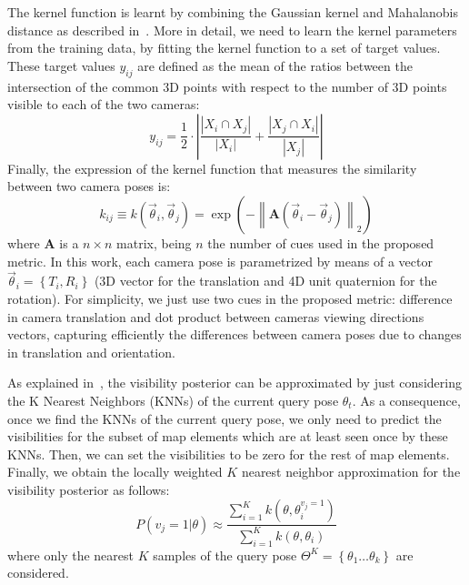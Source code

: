 The kernel function is learnt by combining the Gaussian kernel and
Mahalanobis distance as described in~\cite{Alcantarilla11icra}. More
in detail, we need to learn the kernel parameters from the training
data, by fitting the kernel function to a set of target values. These
target values $y_{ij}$ are defined as the mean of the ratios between
the intersection of the common 3D points with respect to the number of
3D points visible to each of the two cameras:
%
\begin{equation}\label{eq:similarity_weighted}
y_{ij} = \frac{1}{2}\cdot \left| \frac{\left|X_i \cap X_j \right|}{\left|X_i\right|} + \frac{\left|X_j \cap X_i\right|}{\left|X_j\right|} \right|
\end{equation}
%
Finally, the expression of the kernel function that measures the similarity between two camera poses is:
%
\begin{equation}\label{eq:visibility_metric}
 k_{ij} \equiv k(\vec{\theta}_i,\vec{\theta}_j) =\exp\left(-\left\| \mathbf{A}(\vec{\theta}_i-\vec{\theta}_j)\right\|_{2}\right)
\end{equation}
%
where $\mathbf{A}$ is a $n \times n$ matrix, being $n$ the number of
cues used in the proposed metric. In this work, each camera pose is
parametrized by means of a vector $\vec{\theta}_i =
\left\{T_{i},R_{i}\right\}$ (3D vector for the translation and 4D unit
quaternion for the rotation). For simplicity, we just use two cues in
the proposed metric: difference in camera translation and dot product
between cameras viewing directions vectors, capturing efficiently the
differences between camera poses due to changes in translation and
orientation.

As explained in~\cite{Alcantarilla11icra}, the visibility posterior
can be approximated by just considering the K Nearest Neighbors (KNNs)
of the current query pose $\theta_{t}$. As a consequence, once we find
the KNNs of the current query pose, we only need to predict the
visibilities for the subset of map elements which are at least seen
once by these KNNs. Then, we can set the visibilities to be zero for
the rest of map elements. Finally, we obtain the locally weighted $K$
nearest neighbor approximation for the visibility posterior as
follows:
%
\begin{equation} \label{eq:KNNVisibility}
P(v_{j}=1|\theta) \approx \frac{\sum\limits_{i=1}^{K}k(\theta,\theta_{i}^{v_{j}=1})}{\sum\limits_{i=1}^{K}k(\theta,\theta_{i})}
\end{equation}
%
where only the nearest $K$ samples of the query pose
$\Theta^{K}=\left\{\theta_{1} \ldots \theta_{k}\right\}$ are
considered.

